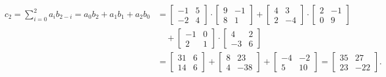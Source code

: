 \begin{align*}
 c_2 = \sum_{i = 0}^2 a_i b_{2 - i} = a_0b_2+a_1b_1+a_2b_0&= \begin{bmatrix} 
-1 & 5 \\
-2 & 4
\end{bmatrix} \cdot \begin{bmatrix} 
9 & -1\\
8 & 1
\end{bmatrix}+ \begin{bmatrix} 
4 & 3\\
2 & -4
\end{bmatrix} \cdot\begin{bmatrix}
2 & -1\\
0 & 9
\end{bmatrix}\\
&\quad +\begin{bmatrix}
-1 & 0\\
2 & 1
\end{bmatrix}\cdot \begin{bmatrix}
4 & 2\\
-3 & 6
\end{bmatrix}\\
&=\begin{bmatrix}
31 & 6\\
14 & 6
\end{bmatrix}+\begin{bmatrix}
8 & 23\\
4 & -38
\end{bmatrix}+\begin{bmatrix}
-4 & -2\\
5 & 10
\end{bmatrix}=\begin{bmatrix}
35 & 27\\
23 & -22
\end{bmatrix}.
\end{align*}

